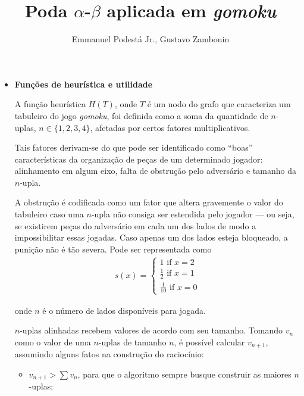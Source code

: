 \documentclass{../../sftex/sftex}
\title{Poda $\alpha$-$\beta$ aplicada em \textit{gomoku}}
\author{Emmanuel Podestá Jr., Gustavo Zambonin}
\begin{document}
\maketitle

\begin{itemize}

    \item \textbf{Funções de heurística e utilidade}

        A função heurística $H(T)$, onde $T$ é um nodo do grafo que
        caracteriza um tabuleiro do jogo \textit{gomoku}, foi definida como
        a soma da quantidade de $n$- uplas, $n \in \{1, 2, 3, 4\}$, afetadas
        por certos fatores multiplicativos.

        Tais fatores derivam-se do que pode ser identificado como ``boas''
        características da organização de peças de um determinado jogador:
        alinhamento em algum eixo, falta de obstrução pelo adversário e
        tamanho da $n$-upla.

        A obstrução é codificada como um fator que altera gravemente o valor
        do tabuleiro caso uma $n$-upla não consiga ser estendida pelo jogador
        --- ou seja, se existirem peças do adversário em cada um dos lados
        de modo a impossibilitar essas jogadas. Caso apenas um dos lados
        esteja bloqueado, a punição não é tão severa. Pode ser representada
        como
        \begin{align*}
            s(x) =
            \begin{cases}
                1 \text{ if } x = 2 \\
                \frac{1}{2} \text{ if } x = 1 \\
                \frac{1}{10} \text{ if } x = 0
            \end{cases}
        \end{align*}

        onde $n$ é o número de lados disponíveis para jogada.

        $n$-uplas alinhadas recebem valores de acordo com seu tamanho. Tomando
        $v_n$ como o valor de uma $n$-uplas de tamanho $n$, é possível
        calcular $v_{n + 1}$, assumindo alguns fatos na construção do
        raciocínio:

        \begin{itemize}

            \item $v_{n + 1} > \sum v_n$, para que o algoritmo sempre busque
                construir as maiores $n$-uplas;


\end{itemize}
\end{itemize}
\end{document}
